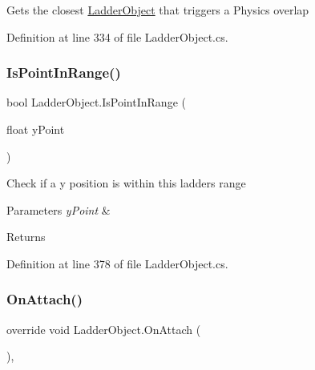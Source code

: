 Gets the closest \mbox{\hyperlink{class_ladder_object}{Ladder\+Object}} that triggers a Physics overlap 



Definition at line 334 of file Ladder\+Object.\+cs.

\mbox{\label{class_ladder_object_a0471a8e39366827430f1d685e02947a4}} 
\subsubsection{\texorpdfstring{Is\+Point\+In\+Range()}{IsPointInRange()}}
{\footnotesize\ttfamily bool Ladder\+Object.\+Is\+Point\+In\+Range (\begin{DoxyParamCaption}\item[{float}]{y\+Point }\end{DoxyParamCaption})}



Check if a y position is within this ladder\textquotesingle{}s range 


\begin{DoxyParams}{Parameters}
{\em y\+Point} & \\
\hline
\end{DoxyParams}
\begin{DoxyReturn}{Returns}

\end{DoxyReturn}


Definition at line 378 of file Ladder\+Object.\+cs.

\mbox{\label{class_ladder_object_ae0bd6ffec9b6cd52fa349df754d2f1fa}} 
\subsubsection{\texorpdfstring{On\+Attach()}{OnAttach()}}
{\footnotesize\ttfamily override void Ladder\+Object.\+On\+Attach (\begin{DoxyParamCaption}{ }\end{DoxyParamCaption})\hspace{0.3cm}{\ttfamily [protected]}, {\ttfamily [virtual]}}




